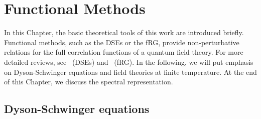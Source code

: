 \chapter{Functional Methods}
\label{chapter:functional-methods}

In this Chapter, the basic theoretical tools of this work are introduced briefly. Functional methods, such as the DSEs or the fRG, provide non-perturbative relations for the full correlation functions of a quantum field theory. For more detailed reviews, see~\cite{Swanson2010} (DSEs) and~\cite{Kopietz2010,Pawlowski2007} (fRG). In the following, we will put emphasis on Dyson-Schwinger equations and field theories at finite temperature. At the end of this Chapter, we discuss the spectral representation.

\section{Dyson-Schwinger equations}
\label{section:dyson-schwinger-equations}

